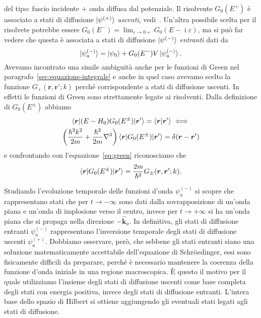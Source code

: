 \documentclass[a4paper,fleqn,twoside,12pt]{article}
\renewcommand{\epsilon}{\varepsilon}
\DeclareMathOperator{\uimm}{\mathrm{i}} %
\newcommand*{\versor}[1]{\hat{\bm{#1}}}
\begin{document}
del tipo: fascio incidente $+$ onda diffusa dal potenziale.  Il risolvente
$G_{0}(E^{+})$ è associato a stati di diffusione $\ket{\psi^{(+)}}$
\emph{uscenti}, vedi~\textcite[450-452]{ballentine:quantum-mechanics}.  Un'altra
possibile scelta per il risolvete potrebbe essere
$G_{0}(E^{-}) = \lim_{\epsilon \to 0+} G_{0}(E - \uimm \epsilon)$, ma si può far
vedere che questa è associata a stati di diffusione $\ket{\psi^{(-)}}$
\emph{entranti} dati da
\begin{equation}
  \ket{\psi_{a}^{(-)}} = \ket{\psi_{0}} + G_{0}(E^{-})V\ket{\psi_{a}^{(-)}}.
\end{equation}
Avevamo incontrato una simile ambiguità anche per le funzioni di Green nel
paragrafo~\ref{sec:equazione-integrale} e anche in quel caso avevamo scelto la
funzione $G_{+}(\bm{r},\bm{r}';k)$ perché corrispondente a stati di diffusione
uscenti.  In effetti le funzioni di Green sono strettamente legate ai
risolventi.  Dalla definizione di $G_{0}(E^{\pm})$ abbiamo
\begin{gather}
  \braket{\bm{r} | (E - H_{0})G_{0}(E^{\pm}) | \bm{r}'} = \braket{\bm{r} |
    \bm{r}'} \iff \\
  \bigg(\frac{\hslash^{2}k^{2}}{2m} + \frac{\hslash^{2}}{2m}\nabla^{2}\bigg)
  \braket{\bm{r} | G_{0}(E^{\pm}) | \bm{r}'} = \delta(\bm{r} - \bm{r}')
\end{gather}
e confrontando con l'equazione~\eqref{eq:green} riconosciamo che
\begin{equation}
  \braket{\bm{r} | G_{0}(E^{\pm}) | \bm{r}'} =
  \frac{2m}{\hslash^{2}}G_{\pm}(\bm{r},\bm{r}';k).
\end{equation}

Studiando l'evoluzione temporale delle funzioni d'onda $\psi_{a}^{(-)}$ si
scopre che rappresentano stati che per $t \to -\infty$ sono dati dalla
sovrapposizione di un'onda piana e un'onda di implosione verso il centro, invece
per $t \to +\infty$ si ha un'onda piana che si propaga nella direzione
$-\versor{k}_{a}$.  In definitiva, gli stati di diffusione entranti
$\psi_{a}^{(-)}$ rappresentano l'inversione temporale degli stati di diffusione
uscenti $\psi_{a}^{(+)}$.  Dobbiamo osservare, però, che sebbene gli stati
entranti siano una soluzione matematicamente accettabile dell'equazione di
Schröedinger, essi sono fisicamente difficili da preparare, perché è necessario
mantenere la coerenza della funzione d'onda iniziale in una regione
macroscopica.  È questo il motivo per il quale utilizziamo l'insieme degli stati
di diffusione uscenti come base completa degli stati con energia positiva,
invece degli stati di diffusione entranti.  L'intera base dello spazio di
Hilbert si ottiene aggiungendo gli eventuali stati legati agli stati di
diffusione.
\end{document}
